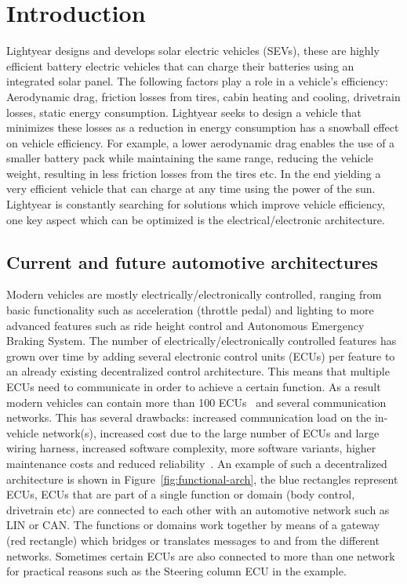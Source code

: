 \section{Introduction}
\label{sec:introduction}
Lightyear designs and develops solar electric vehicles (SEVs), these are highly efficient battery electric vehicles that can charge their batteries using an integrated solar panel. The following factors play a role in a vehicle's efficiency: Aerodynamic drag, friction losses from tires, cabin heating and cooling, drivetrain losses, static energy consumption. Lightyear seeks to design a vehicle that minimizes these losses as a reduction in energy consumption has a snowball effect on vehicle efficiency. For example, a lower aerodynamic drag enables the use of a smaller battery pack while maintaining the same range, reducing the vehicle weight, resulting in less friction losses from the tires etc. In the end yielding a very efficient vehicle that can charge at any time using the power of the sun. Lightyear is constantly searching for solutions which improve vehicle efficiency, one key aspect which can be optimized is the electrical/electronic architecture.

\subsection{Current and future automotive architectures}
\label{sec:automotive-arch}
Modern vehicles are mostly electrically/electronically controlled, ranging from basic functionality such as acceleration (throttle pedal) and lighting to more advanced features such as ride height control and Autonomous Emergency Braking System. The number of electrically/electronically controlled features has grown over time by adding several electronic control units (ECUs) per feature to an already existing decentralized control architecture. This means that multiple ECUs need to communicate in order to achieve a certain function. As a result modern vehicles can contain more than 100 ECUs~\cite{bandur2021making} and several communication networks. This has several drawbacks: increased communication load on the in-vehicle network(s), increased cost due to the large number of ECUs and large wiring harness, increased software complexity, more software variants, higher maintenance costs and reduced reliability~\cite{bandur2021making}. An example of such a decentralized architecture is shown in Figure~\ref{fig:functional-arch}, the blue rectangles represent ECUs, ECUs that are part of a single function or domain (body control, drivetrain etc) are connected to each other with an automotive network such as LIN or CAN. The functions or domains work together by means of a gateway (red rectangle) which bridges or translates messages to and from the different networks. Sometimes certain ECUs are also connected to more than one network for practical reasons such as the Steering column ECU in the example.

